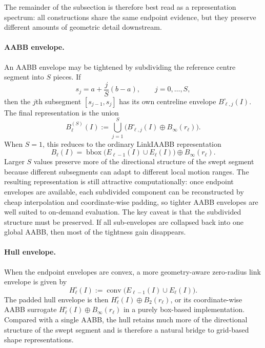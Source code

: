 \documentclass[journal]{IEEEtran}
\begin{document}
The remainder of the subsection is therefore best read as a representation
spectrum: all constructions share the same endpoint evidence, but they preserve
different amounts of geometric detail downstream.

\paragraph{AABB envelope.}
An AABB envelope may be tightened by subdividing the reference centre segment
into $S$ pieces. If
\[
s_j = a + \frac{j}{S}(b-a), \qquad j=0,\dots,S,
\]
then the $j$th subsegment $[s_{j-1},s_j]$ has its own centreline envelope
$B^{\circ}_{\ell,j}(I)$. The final representation is the union
\[
B^{(S)}_\ell(I) := \bigcup_{j=1}^{S}
\bigl(B^{\circ}_{\ell,j}(I) \oplus B_\infty(r_\ell)\bigr).
\]
When $S=1$, this reduces to the ordinary LinkIAABB representation
\[
B_\ell(I) = \operatorname{bbox}\bigl(E_{\ell-1}(I) \cup E_\ell(I)\bigr)
\oplus B_\infty(r_\ell).
\]
Larger $S$ values preserve more of the directional structure of the swept
segment because different subsegments can adapt to different local motion
ranges. The resulting representation is still attractive computationally:
once endpoint envelopes are available, each subdivided component can be
reconstructed by cheap interpolation and coordinate-wise padding, so tighter
AABB envelopes are well suited to on-demand evaluation. The key caveat is that
the subdivided structure must be preserved. If all sub-envelopes are collapsed
back into one global AABB, then most of the tightness gain disappears.

\paragraph{Hull envelope.}
When the endpoint envelopes are convex, a more geometry-aware zero-radius link
envelope is given by
\[
H_\ell^{\circ}(I) := \operatorname{conv}\bigl(E_{\ell-1}(I) \cup E_\ell(I)\bigr).
\]
The padded hull envelope is then $H_\ell^{\circ}(I) \oplus B_2(r_\ell)$, or its
coordinate-wise AABB surrogate
$H_\ell^{\circ}(I) \oplus B_\infty(r_\ell)$ in a purely box-based
implementation. Compared with a single AABB, the hull retains much more of the
directional structure of the swept segment and is therefore a natural bridge to
grid-based shape representations.
\end{document}
